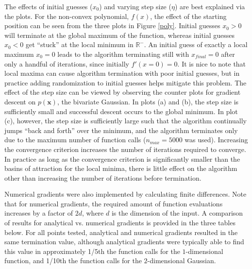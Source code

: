 \documentclass[10pt]{article}
\begin{document}
The effects of initial guesses ($x_0$) and varying step size ($\eta$) are best explained via the plots.  For the non-convex polynomial, $f(x)$, the effect of the starting position can be seen from the three plots in Figure \ref{poly}.  Initial guesses $x_0 > 0$ will terminate at the global maximum of the function, whereas initial guesses $x_0 < 0$ get ``stuck'' at the local minimum in $\mathbb{R}^-$.  An initial guess of exactly a local maximum $x_0 = 0$ leads to the algorithm terminating still with $x_{final} = 0$ after only a handful of iterations, since initially $f'(x=0)=0$.  It is nice to note that local maxima can cause algorithm termination with poor initial guesses, but in practice adding randomization to initial guesses helps mitigate this problem.  The effect of the step size can be viewed by observing the counter plots for gradient descent on $p(\mathbf{x})$, the bivariate Gaussian.  In plots (a) and (b), the step size is sufficiently small and successful descent occurs to the global minimum.  In plot (c), however, the step size is sufficiently large such that the algorithm continually jumps ``back and forth'' over the minimum, and the algorithm terminates only due to the maximum number of function calls ($n_{max}=5000$ was used).  Increasing the convergence criterion increases the number of iterations required to converge.  In practice as long as the convergence criterion is significantly smaller than the basins of attraction for the local minima, there is little effect on the algorithm other than increasing the number of iterations before termination.

Numerical gradients were also implemented by calculating finite differences.  Note that for numerical gradients, the required amount of function evaluations increases by a factor of $2d$, where $d$ is the dimension of the input.  A comparison of results for analytical vs. numerical gradients is provided in the three tables below.  For all points tested, analytical and numerical gradients resulted in the same termination value, although analytical gradients were typically able to find this value in approximately 1/5th the function calls for the $1$-dimensional function, and 1/10th the function calls for the $2$-dimensional Gaussian.
\end{document}
